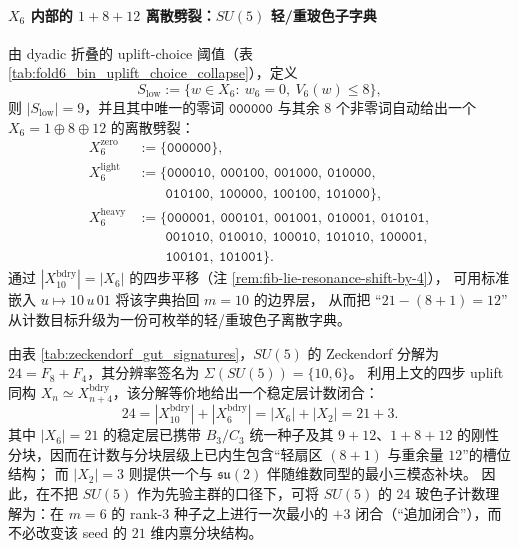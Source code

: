 \paragraph{\texorpdfstring{$X_6$}{X6} 内部的 $1+8+12$ 离散劈裂：\texorpdfstring{$SU(5)$}{SU(5)} 轻/重玻色子字典}
由 dyadic 折叠的 uplift-choice 阈值（表 \ref{tab:fold6_bin_uplift_choice_collapse}），定义
\[
S_{\mathrm{low}}:=\{w\in X_6:\ w_6=0,\ V_6(w)\le 8\},
\]
则 \(|S_{\mathrm{low}}|=9\)，并且其中唯一的零词 \(\texttt{000000}\) 与其余 \(8\) 个非零词自动给出一个
\(
X_6=1\oplus 8\oplus 12
\)
的离散劈裂：
\[
\begin{aligned}
X_6^{\mathrm{zero}}&:=\{\texttt{000000}\},\\
X_6^{\mathrm{light}}&:=\{\texttt{000010},\ \texttt{000100},\ \texttt{001000},\ \texttt{010000},\\
&\qquad \texttt{010100},\ \texttt{100000},\ \texttt{100100},\ \texttt{101000}\},\\
X_6^{\mathrm{heavy}}&:=\{\texttt{000001},\ \texttt{000101},\ \texttt{001001},\ \texttt{010001},\ \texttt{010101},\\
&\qquad \texttt{001010},\ \texttt{010010},\ \texttt{100010},\ \texttt{101010},\ \texttt{100001},\\
&\qquad \texttt{100101},\ \texttt{101001}\}.
\end{aligned}
\]
通过 \(|X_{10}^{\mathrm{bdry}}|=|X_6|\) 的四步平移（注 \ref{rem:fib-lie-resonance-shift-by-4}），
可用标准嵌入 \(u\mapsto 10\,u\,01\) 将该字典抬回 \(m=10\) 的边界层，
从而把 “\(21-(8+1)=12\)” 从计数目标升级为一份可枚举的轻/重玻色子离散字典。

\begin{corollary}[\texorpdfstring{$SU(5)$}{SU(5)} 的 \(21+3\) 计数闭合：从 \(m=6\) 统一种子到 \(24\) 槽位]\label{cor:su5-21-plus-3-closure}
由表 \ref{tab:zeckendorf_gut_signatures}，\(SU(5)\) 的 Zeckendorf 分解为 \(24=F_8+F_4\)，其分辨率签名为
\(\Sigma(SU(5))=\{10,6\}\)。
利用上文的四步 uplift 同构 \(X_n\simeq X_{n+4}^{\mathrm{bdry}}\)，该分解等价地给出一个稳定层计数闭合：
\[
24=|X^{\mathrm{bdry}}_{10}|+|X^{\mathrm{bdry}}_{6}|=|X_{6}|+|X_{2}|=21+3.
\]
其中 \(|X_6|=21\) 的稳定层已携带 \(B_3/C_3\) 统一种子及其 \(9+12\)、\(1+8+12\) 的刚性分块，因而在计数与分块层级上已内生包含“轻扇区 \((8+1)\) 与重余量 \(12\)”的槽位结构；
而 \(|X_2|=3\) 则提供一个与 \(\mathfrak{su}(2)\) 伴随维数同型的最小三模态补块。
因此，在不把 \(SU(5)\) 作为先验主群的口径下，可将 \(SU(5)\) 的 \(24\) 玻色子计数理解为：在 \(m=6\) 的 rank-\(3\) 种子之上进行一次最小的 \(+3\) 闭合（“追加闭合”），而不必改变该 seed 的 \(21\) 维内禀分块结构。
\end{corollary}

